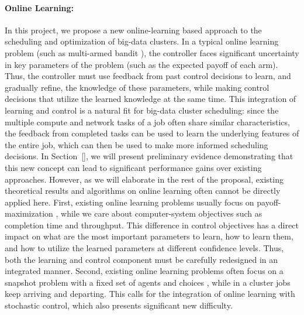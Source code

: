 \paragraph*{Online Learning:} In this project, we propose a new
online-learning based approach to the scheduling and optimization of
big-data clusters. In a typical online learning problem (such as
multi-armed bandit \cite{MAB}), the controller faces significant
uncertainty in key parameters of the problem (such as the expected
payoff of each arm). Thus, the controller must use feedback from past
control decisions to learn, and gradually refine, the knowledge of these
parameters, while making control decisions that utilize the learned
knowledge at the same time. This integration of learning and control is
a natural fit for big-data cluster scheduling: since the multiple
compute and network tasks of a job often share similar characteristics, 
the feedback from
completed tasks can be used to learn the underlying
features of the entire job, which can then be used to make more informed
scheduling decisions. In Section~\ref{}, we will present 
preliminary evidence demonstrating that this new concept can
lead to significant performance gains over
existing approaches. 
However, as we will elaborate in the rest of the proposal, existing
theoretical results and algorithms on online learning often cannot be
directly applied here.
First, existing online learning problems usually focus on
payoff-maximization \cite{MAB}, while we care about computer-system objectives such
as completion time and throughput. This difference in control objectives
has a direct impact on what are the most important parameters to learn,
how to learn them, and how to utilize the learned parameters at
different confidence levels. Thus, both the learning and control
component must be carefully redesigned in an integrated manner. 
Second, existing online learning problems often focus on a snapshot
problem with a fixed set of agents and choices \cite{snapshot}, while in
a cluster jobs keep arriving and departing. This calls for the
integration of online
learning with stochastic control, which also presents significant new
difficulty. 


\fi
